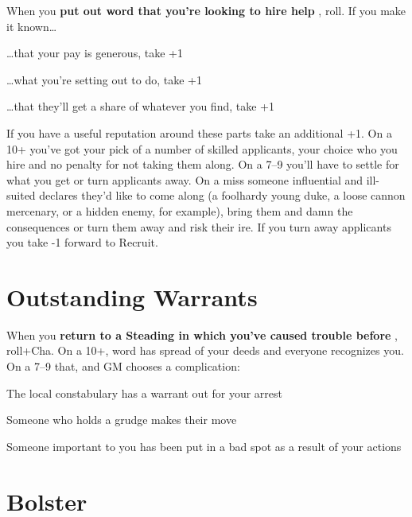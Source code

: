 When you {\bf put out word that you're looking to hire help} , roll. If you make it known…

       
\startitemize[1,packed]
         
\item …that your pay is generous, take +1

         
\item …what you're setting out to do, take +1

         
\item …that they'll get a share of whatever you find, take +1

       
\stopitemize
       

If you have a useful reputation around these parts take an additional +1. On a 10+ you've got your pick of a number of skilled applicants, your choice who you hire and no penalty for not taking them along. On a 7–9 you'll have to settle for what you get or turn applicants away. On a miss someone influential and ill-suited declares they'd like to come along (a foolhardy young duke, a loose cannon mercenary, or a hidden enemy, for example), bring them and damn the consequences or turn them away and risk their ire. If you turn away applicants you take -1 forward to Recruit.

       
\section{Outstanding Warrants}   
       

When you {\bf return to a Steading in which you've caused trouble before} , roll+Cha. On a 10+, word has spread of your deeds and everyone recognizes you. On a 7–9 that, and GM chooses a complication:

       
\startitemize[1,packed]
         
\item The local constabulary has a warrant out for your arrest

         
\item Someone who holds a grudge makes their move

         
\item Someone important to you has been put in a bad spot as a result of your actions

       
\stopitemize
       
\section{Bolster}   
       

